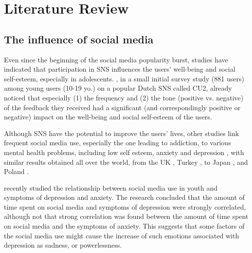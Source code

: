 \documentclass[a4paper,fleqn]{cas-dc}
\begin{document}
\section{Literature Review}
\label{literaturereview}

\subsection{The influence of  social media}

Even since the beginning of the social media popularity burst, studies have indicated that  participation in SNS  influences  the users' well-being and social self-esteem, especially in adolescents. \citet{valkenburg2006friend}, in a small initial survey study (881 users) among young users (10-19 yo.) on a popular Dutch SNS called CU2, already noticed that especially  (1) the frequency  and (2) the tone (positive vs. negative) of the feedback they received had a significant (and correspondingly positive or negative) impact on the well-being and social self-esteem of the users.

Although SNS have the potential to  improve the users' lives, other studies link frequent social media use, especially the one leading to addiction,  to various mental health problems, including low self esteem, anxiety and depression  
\citep{beran2005cyber, hinduja2008cyberbullying,campbell2012victims,woods2016sleepyteens}, with similar results obtained all over the world, from the UK \citep{kelly2018social}, Turkey \citep{kircaburun2016self}, to Japan \citep{kitazawa2018associations}, and Poland \citep{pyzalski2019polish}.

\citet{culpepperexploring} recently studied the relationship between social media use in youth and symptoms of depression and anxiety. The research concluded that the amount of time spent on social media and symptoms of depression were strongly correlated, although not that strong correlation was found between the amount of time spent on social media and the symptoms of anxiety. This suggests that some factors of the social media use might cause the increase of such emotions associated with depression as sadness, or powerlessness.
\end{document}
